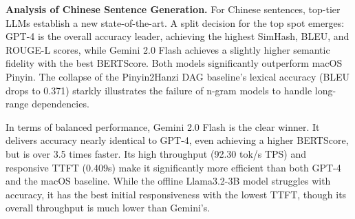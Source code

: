 \documentclass[10pt, a4paper]{article}
\begin{document}


\textbf{Analysis of Chinese Sentence Generation.}
For Chinese sentences, top-tier LLMs establish a new state-of-the-art. A split decision for the top spot emerges: {GPT-4} is the overall accuracy leader, achieving the highest SimHash, BLEU, and ROUGE-L scores, while {Gemini 2.0 Flash} achieves a slightly higher semantic fidelity with the best BERTScore. Both models significantly outperform {macOS Pinyin}. 
The collapse of the {Pinyin2Hanzi DAG} baseline's lexical accuracy (BLEU drops to 0.371) starkly illustrates the failure of n-gram models to handle long-range dependencies.

In terms of balanced performance, {Gemini 2.0 Flash} is the clear winner. It delivers accuracy nearly identical to GPT-4, even achieving a higher BERTScore, but is over 3.5 times faster. Its high throughput (92.30 tok/s TPS) and responsive TTFT (0.409s) make it significantly more efficient than both GPT-4 and the macOS baseline. While the offline {Llama3.2-3B} model struggles with accuracy, it has the best initial responsiveness with the lowest TTFT, though its overall throughput is much lower than Gemini's.
\end{document}
